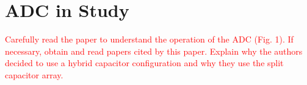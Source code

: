 \section{ADC in Study}
\label{sec:adc_in_study}

\textcolor{red}{Carefully read the paper to understand the operation of the ADC (Fig. 1). If
necessary, obtain and read papers cited by this paper. Explain why the authors decided to use a hybrid capacitor configuration and why they use the split capacitor array.}